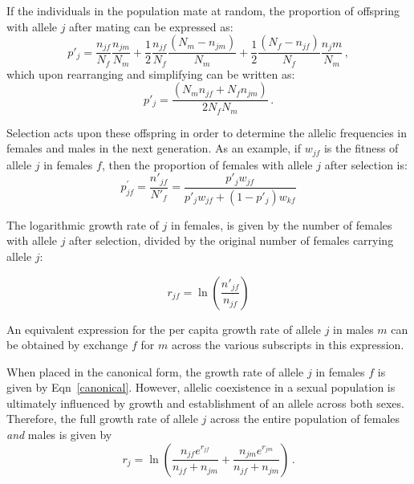 \documentclass[]{article}
\begin{document}
If the individuals in the population mate at random, the proportion of offspring with allele $j$ after mating can be expressed as:
\begin{equation}
   p'_{j}= \frac{n_{jf}}{N_{f}} \frac{n_{jm}}{N_{m}} + \frac{1}{2} \frac{n_{jf}}{N_{f}} \frac{(N_{m}-n_{jm})}{N_{m}} +\frac{1}{2}
   \frac{(N_{f}-n_{jf})}{N_{f}} \frac{n_jm}{N_{m}} \,,
\end{equation}
which upon rearranging and simplifying can be written as:
\begin{equation}
   p'_{j}= \frac{(N_{m}n_{jf}+ N_{f}n_{jm})}{2 N_{f}N_{m}} \,.
   \label{pprime}
\end{equation}

Selection acts upon these offspring in order to determine the allelic frequencies in females and males in the next generation. As an example, if $w_{jf}$ is the fitness of allele $j$ in females $f$, then the proportion of females with allele $j$ after selection is:
\begin{equation}
   p^{\prime}_{jf}= \frac{n'_{jf}}{N'_{f}} = \frac{p'_{j}w_{jf}}{p'_{j}w_{jf}+ (1-p'_{j})w_{kf}}
\end{equation}

The logarithmic growth rate of $j$ in females, is given by the number of females with allele $j$ after selection, divided by the original number of females carrying allele $j$:



\begin{equation}
    r_{jf} = \ln \left( \frac{n'_{jf}}{n_{jf}} \right)
    \label{canonical}
\end{equation}


An equivalent expression for the per capita growth rate of allele $j$ in males $m$ can be obtained by exchange $f$ for $m$ across the various subscripts in this expression.

When placed in the canonical form, the growth rate of allele $j$ in females $f$ is given by Eqn~\ref{canonical}. However, allelic coexistence in a sexual population is ultimately influenced by growth and establishment of an allele across both sexes. Therefore, the full growth rate of allele $j$ across the entire population of females \emph{and} males is given by
\begin{equation}
    r_{j} = \ln \left(  \frac{n_{jf}e^{r_{jf}}}{n_{jf} + n_{jm}}   +  \frac{n_{jm}e^{r_{{jm}}}}{n_{jf} + n_{jm}}  \right) \,.
    \label{full}
\end{equation}
\end{document}
